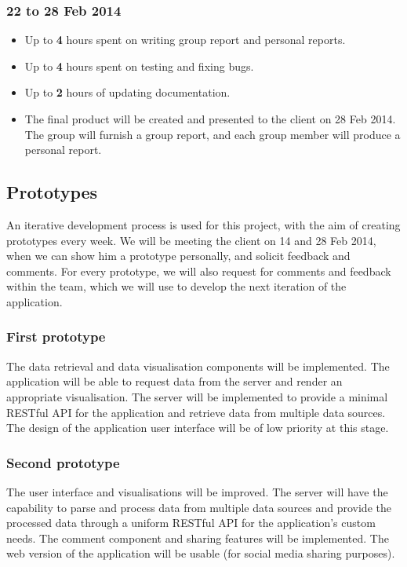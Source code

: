 \documentclass[12pt,a4paper,twoside]{article}
\begin{document}
\subsubsection{22 to 28 Feb 2014}
\begin{itemize}
	\item Up to \textbf{4} hours spent on writing group report and personal reports.
	\item Up to \textbf{4} hours spent on testing and fixing bugs.
	\item Up to \textbf{2} hours of updating documentation.
	\item The final product will be created and presented to the client on 28 Feb 2014. The group will furnish a group report, and each group member will produce a personal report.
\end{itemize}

\subsection{Prototypes}
An iterative development process is used for this project, with the aim of creating prototypes every week. We will be meeting the client on 14 and 28 Feb 2014, when we can show him a prototype personally, and solicit feedback and comments. For every prototype, we will also request for comments and feedback within the team, which we will use to develop the next iteration of the application.

\subsubsection{First prototype}
The data retrieval and data visualisation components will be implemented. The application will be able to request data from the server and render an appropriate visualisation. The server will be implemented to provide a minimal RESTful API for the application
and retrieve data from multiple data sources. The design of the application user interface will be of low priority at this stage.

\subsubsection{Second prototype}
The user interface and visualisations will be improved. The server will have the capability to parse and process data from multiple data sources and provide the processed data through a uniform RESTful API for the application's custom needs. The comment component and sharing features will be implemented. The web version of the application will be usable (for social media sharing purposes).
\end{document}

